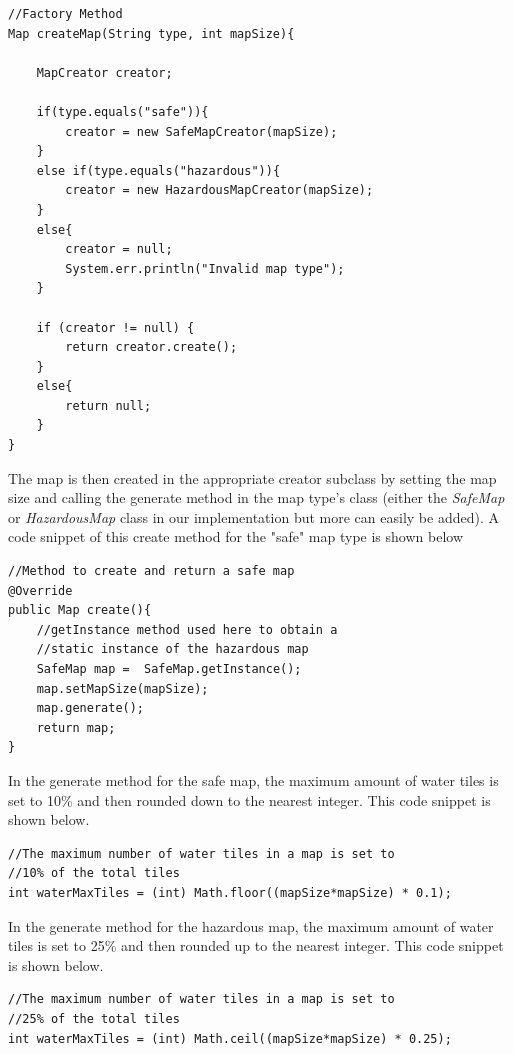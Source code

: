 \documentclass[a4paper,12pt]{extarticle}
\begin{document}
\vspace{-1mm}
\begin{lstlisting}
//Factory Method
Map createMap(String type, int mapSize){

    MapCreator creator;

    if(type.equals("safe")){
        creator = new SafeMapCreator(mapSize);
    }
    else if(type.equals("hazardous")){
        creator = new HazardousMapCreator(mapSize);
    }
    else{
        creator = null;
        System.err.println("Invalid map type");
    }

    if (creator != null) {
        return creator.create();
    }
    else{
        return null;
    }
}
\end{lstlisting}
\vspace{4mm}

\noindent The map is then created in the appropriate creator subclass by setting the map size and calling the generate method in the map type's class (either the \textit{SafeMap} or \textit{HazardousMap} class in our implementation but more can easily be added). A code snippet of this create method for the "safe" map type is shown below

\vspace{-1mm}
\begin{lstlisting}
//Method to create and return a safe map
@Override
public Map create(){
    //getInstance method used here to obtain a 
    //static instance of the hazardous map
    SafeMap map =  SafeMap.getInstance();
    map.setMapSize(mapSize);
    map.generate();
    return map;
}
\end{lstlisting}

\noindent In the generate method for the safe map, the maximum amount of water tiles is set to 10\% and then rounded down to the nearest integer. This code snippet is shown below.

\begin{lstlisting}
//The maximum number of water tiles in a map is set to
//10% of the total tiles
int waterMaxTiles = (int) Math.floor((mapSize*mapSize) * 0.1);
\end{lstlisting}
\vspace{4mm}

\noindent In the generate method for the hazardous map, the maximum amount of water tiles is set to 25\% and then rounded up to the nearest integer. This code snippet is shown below.

\begin{lstlisting}
//The maximum number of water tiles in a map is set to 
//25% of the total tiles
int waterMaxTiles = (int) Math.ceil((mapSize*mapSize) * 0.25);
\end{lstlisting}
\vspace{4mm}
\end{document}
